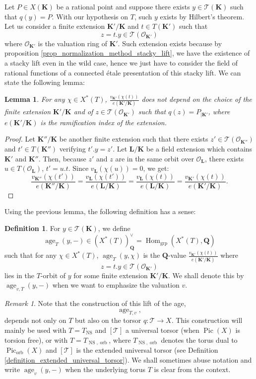 \documentclass{proc-l}
\newcommand{\K}{\mathbf{K}}
\newcommand{\Q}{\mathbf{Q}}
\newcommand{\Le}{\mathbf{L}}
\DeclareMathOperator{\Pic}{Pic}
\DeclareMathOperator{\grp}{grp}
\DeclareMathOperator{\Hom}{Hom}
\DeclareMathOperator{\age}{age}
\DeclareMathOperator{\NS}{NS}
\DeclareMathOperator{\orb}{orb}
\newcommand{\stackT}{\mathcal{T}}
\newcommand{\sheafO}{\mathcal{O}}
\newtheorem{lemma}[theorem]{Lemma}
\theoremstyle{definition}
\newtheorem{definition}[theorem]{Definition}
\theoremstyle{remark}
\newtheorem{remark}[theorem]{Remark}
\numberwithin{equation}{section}
\begin{document}
Let $P \in X(\K)$ be a rational point and suppose there exists $y \in \stackT(\K)$ such that $q(y) = P$. With our hypothesis on $T$, such $y$ exists by Hilbert's theorem. Let us consider a finite extension $\K' / \K$ and $t \in T(\K')$ such that $$z = t . y \in \stackT(\sheafO_{\K'})$$ where $\sheafO_{\K'}$ is the valuation ring of $\K'$. Such extension exists because by proposition \ref{prop_normalization_method_stacky_lift}, we have the existence of a stacky lift even in the wild case, hence we just have to consider the field of rational functions of a connected étale presentation of this stacky lift. We can state the following lemma:

\begin{lemma}
     For any $\chi \in X^*(T)$, $\frac{v_{\K'}(\chi(t))}{e(\K' / \K)} $ does not depend on the choice of the finite extension $\K' / \K$ and of $z \in \stackT(\sheafO_{\K'})$ such that $q(z) = P_{\mid \K'}$, where $e(\K' / \K)$ is the ramification index of the extension. 
\end{lemma}

\begin{proof}
     Let $\K'' / \K$ be another finite extension such that there exists  $z' \in \stackT(\sheafO_{\K''})$ and $t' \in T(\K'')$ verifying $t' . y = z'$. Let $\Le / \K $ be a field extension which contains $\K'$ and $\K''$. Then, because $z'$ and $z$ are in the same orbit over $\sheafO_{\Le}$, there exists $u \in T(\sheafO_{\Le})$, $t' = u.t$. Since $v_{\Le}(\chi(u)) = 0$, we get:
    $$\frac{v_{\K''}(\chi(t'))}{e(\K'' / \K)} = \frac{v_{\Le}(\chi(t'))}{e(\Le / \K)} = \frac{v_{\Le}(\chi(t))}{e(\Le / \K)} = \frac{v_{\K'}(\chi(t))}{e(\K' / \K)}  .$$
\end{proof}

Using the previous lemma, the following definition has a sense:

\begin{definition}\label{def_age_univ_torsor}
   For $y \in \stackT(\K)$, we define $$\age_T(y,-) \in \left(X^*(T)\right)^{\vee}_{\Q} = \Hom_{\grp}(X^*(T),\Q)$$ such that for any $\chi \in X^*(T)$, $\age_T(y,\chi)$ is the $\Q$-value $\frac{v_{\K'}(\chi(t))}{e(\K' / \K)} $ where $$z = t.y \in \stackT(\sheafO_{\K'})$$ lies in the $T$-orbit of $y$ for some finite extension $\K' / \K$. We shall denote this by $\age_{v,T}(y,-)$ when we want to emphasize the valuation $v$.
\end{definition}

\begin{remark}
Note that the construction of this lift of the age,
$$\age_{T,v},$$
depends not only on $T$ but also on the torsor $q : \stackT \rightarrow X$. This construction will mainly be used with $T = T_{\NS}$ and $[\stackT]$ a universal torsor (when
$\Pic(X)$ is torsion free), or with $T = T_{\NS,\orb}$, where $T_{\NS,\orb}$ denotes the
torus dual to $\Pic_{\orb}(X)$ and $[\stackT]$ is the extended universal torsor (see Definition \ref{definition_extended_universal_torsor}). We shall sometimes abuse notation and write
$\age_v(y,-)$ when the underlying torus $T$ is clear from the context. 

\end{remark}
\end{document}
